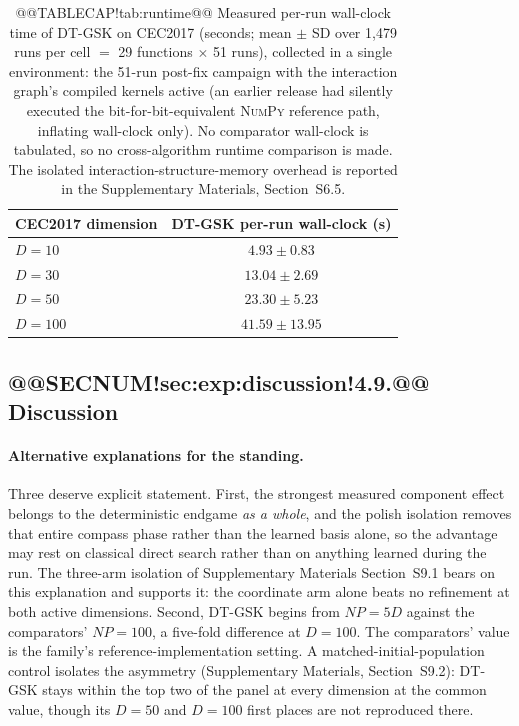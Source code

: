 \documentclass[10pt,a4paper]{article}
\newcommand{\dtgsk}{DT-GSK}
\begin{document}
\begin{table}[H]
\caption{@@TABLECAP!tab:runtime@@ Measured per-run wall-clock time of \dtgsk{} on CEC2017 (seconds; mean
$\pm$ SD over 1{,}479 runs per cell $=$ 29 functions $\times$ 51 runs), collected
in a single environment: the 51-run post-fix campaign with the interaction
graph's compiled kernels active (an earlier release had silently executed the
bit-for-bit-equivalent \textsc{NumPy} reference path, inflating wall-clock only).
No comparator wall-clock is tabulated, so no cross-algorithm runtime comparison
is made. The isolated
interaction-structure-memory overhead is reported in the Supplementary Materials,
Section~S6.5.}\label{tab:runtime}
\zebra
\begin{tabular}{lc}
\toprule
\textbf{CEC2017 dimension} & \textbf{\dtgsk{} per-run wall-clock (s)} \\
\midrule
$D = 10$ & $4.93 \pm 0.83$ \\
$D = 30$ & $13.04 \pm 2.69$ \\
$D = 50$ & $23.30 \pm 5.23$ \\
$D = 100$ & $41.59 \pm 13.95$ \\
\bottomrule
\end{tabular}

\end{table}


\subsection{@@SECNUM!sec:exp:discussion!4.9.@@ Discussion}\label{sec:exp:discussion}


\paragraph{Alternative explanations for the standing.}
Three deserve explicit statement. First, the strongest measured component
effect belongs to the deterministic endgame \emph{as a whole}, and the polish
isolation removes that entire compass phase rather than the learned basis
alone, so the advantage may rest on classical direct search rather than on
anything learned during the run. The three-arm isolation of Supplementary
Materials Section~S9.1 bears on this explanation and supports it: the coordinate
arm alone beats no refinement at both active dimensions. Second, \dtgsk{} begins from
$NP = 5D$ against the comparators' $NP = 100$, a five-fold difference
at $D = 100$. The comparators' value is the family's
reference-implementation setting. A matched-initial-population control
isolates the asymmetry (Supplementary Materials,
Section~S9.2): \dtgsk{} stays within the top two of the panel at every
dimension at the common value, though its $D = 50$ and $D = 100$ first places
are not reproduced there.
\end{document}
